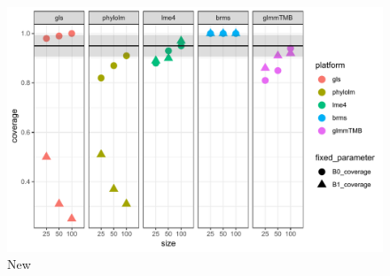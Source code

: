 \documentclass[12pt]{article}
\begin{document}
\begin{center}
\begin{figure}[h]
  \includegraphics[scale=0.8,page=1]{./figure/sscoverage.pdf}
  \caption{New}
\label{ssplot}
\end{figure}
\end{center}




\end{document}
